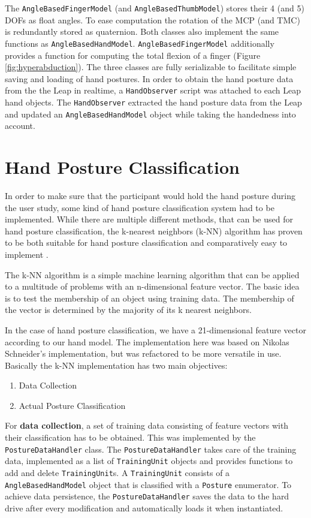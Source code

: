 The \texttt{AngleBasedFingerModel} (and \texttt{AngleBasedThumbModel}) stores their 4 (and 5) DOFs as float angles. To ease computation the rotation of the MCP (and TMC) is redundantly stored as quaternion. Both classes also implement the same functions as \texttt{AngleBasedHandModel}. \texttt{AngleBasedFingerModel} additionally provides a function for computing the total flexion of a finger (Figure \ref{fig:hyperabduction}). The three classes are fully serializable to facilitate simple saving and loading of hand postures.
In order to obtain the hand posture data from the the Leap in realtime, a \texttt{HandObserver} script was attached to each Leap hand objects. The \texttt{HandObserver} extracted the hand posture data from the Leap and updated an \texttt{AngleBasedHandModel} object while taking the handedness into account.

\section{Hand Posture Classification}

In order to make sure that the participant would hold the hand posture during the user study, some kind of hand posture classification system had to be implemented. While there are multiple different methods, that can be used for hand posture classification, the k-nearest neighbors (k-NN) algorithm has proven to be both suitable for hand posture classification and comparatively easy to implement \cite{gardner20143d}. 

The k-NN algorithm is a simple machine learning algorithm that can be applied to a multitude of problems with an n-dimensional feature vector. The basic idea is to test the membership of an object using training data. The membership of the vector is determined by the majority of its k nearest neighbors. 

In the case of hand posture classification, we have a 21-dimensional feature vector according to our hand model. The implementation here was based on Nikolas Schneider's implementation, but was refactored to be more versatile in use. Basically the k-NN implementation has two main objectives:

\begin{enumerate}
	\item Data Collection
	\item Actual Posture Classification
\end{enumerate}

For \textbf{data collection}, a set of training data consisting of feature vectors with their classification has to be obtained. This was implemented by the \texttt{PostureDataHandler} class. The \texttt{PostureDataHandler} takes care of the training data, implemented as a list of \texttt{TrainingUnit} objects and provides functions to add and delete \texttt{TrainingUnit}s. A \texttt{TrainingUnit} consists of a \texttt{AngleBasedHandModel} object that is classified with a \texttt{Posture} enumerator. To achieve data persistence, the \texttt{PostureDataHandler} saves the data to the hard drive after every modification and automatically loads it when instantiated.


